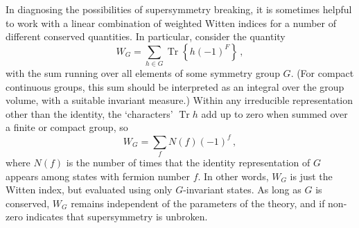 In diagnosing the possibilities of supersymmetry breaking, it is
sometimes helpful to work with a linear combination of weighted Witten
indices for a number of different conserved quantities. In particular,
consider the quantity
\begin{equation}
  W_G
  =
  \sum_{h\in G}\operatorname{Tr}\left\{h(-1)^F\right\}\,,
  \tag{29.1.6}\label{eq:29.1.6}
\end{equation}
with the sum running over all elements of some symmetry group \(G\). (For
compact continuous groups, this sum should be interpreted as an integral
over the group volume, with a suitable invariant measure.) Within any
irreducible representation other than the identity, the `characters'
\(\operatorname{Tr}h\) add up to zero when summed over a finite or compact
group, so
\begin{equation}
  W_G=\sum_fN(f)(-1)^f\,,
  \tag{29.1.7}\label{eq:29.1.7}
\end{equation}
where \(N(f)\) is the number of times that the identity representation of
\(G\) appears among states with fermion number \(f\). In other words,
\(W_G\) is just the Witten index, but evaluated using only \(G\)-invariant
states. As long as \(G\) is conserved, \(W_G\) remains independent of the
parameters of the theory, and if non-zero indicates that supersymmetry is
unbroken.

